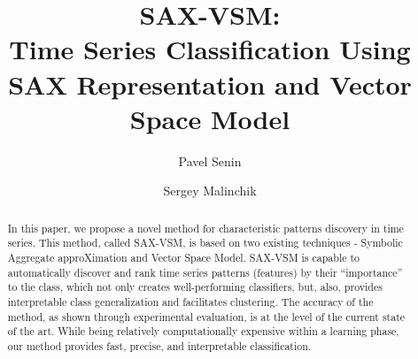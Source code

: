 \documentclass{llncs}
\begin{document}
%
\mainmatter              %
%
\title{SAX-VSM: \\Time Series Classification Using SAX Representation and Vector Space Model}
%
%
\author{Pavel Senin
\and Sergey Malinchik
}
%
%
%


\maketitle              %

\begin{abstract}
In this paper, we propose a novel method for characteristic patterns discovery in 
time series. This method, called SAX-VSM, is based on two existing techniques - 
Symbolic Aggregate approXimation and Vector Space Model. SAX-VSM is capable 
to automatically discover and rank time series patterns (features) by their 
“importance” to the class, which not only creates well-performing classifiers, 
but, also, provides interpretable class generalization and facilitates clustering. 
The accuracy of the method, as shown through experimental evaluation, is at the 
level of the current state of the art. 
While being relatively computationally expensive within a learning phase, 
our method provides fast, precise, and interpretable classification.
\end{abstract}
%
\end{document}
